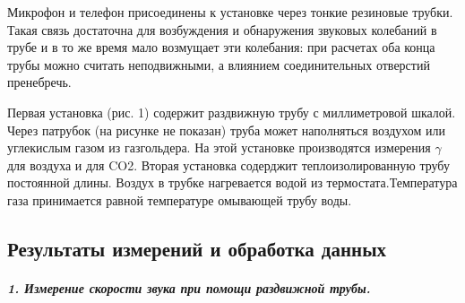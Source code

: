 \documentclass[12pt,a4paper]{article}
\begin{document}
Микрофон и телефон присоединены к установке через тонкие резиновые трубки. Такая связь достаточна для возбуждения и обнаружения звуковых колебаний в трубе и в то же время мало возмущает эти колебания: при расчетах оба конца трубы можно считать неподвижными, а влиянием соединительных отверстий пренебречь. 

Первая установка (рис. 1) содержит раздвижную трубу с миллиметровой шкалой. Через патрубок (на рисунке не показан) труба может наполняться воздухом или углекислым газом из газгольдера. На этой установке производятся измерения $\gamma$ для воздуха и для CO2. Вторая установка содерджит теплоизолированную трубу постоянной длины. Воздух в трубке нагревается водой из термостата.Температура газа принимается равной температуре омывающей трубу воды. 

\subsection*{Результаты измерений и обработка данных}
\subparagraph{1. Измерение скорости звука при помощи раздвижной трубы.}
\end{document}
